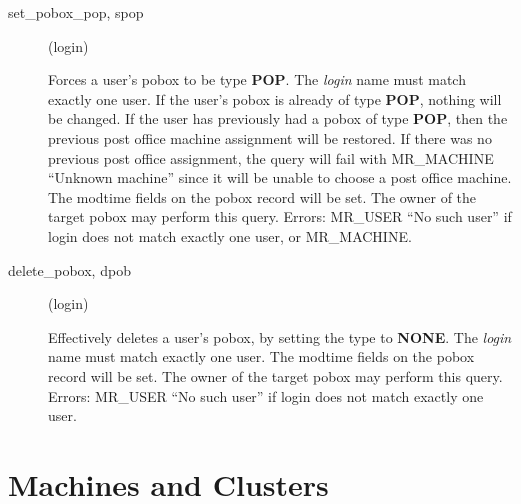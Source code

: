 \documentclass{article}
\begin{document}
\begin{description}
\item[set\_pobox\_pop, spop](login)

Forces a user's pobox to be type {\bf POP}.  The {\em login} name must
match exactly one user.  If the user's pobox is already of type
{\bf POP}, nothing will be changed.  If the user has previously had a
pobox of type {\bf POP}, then the previous post office machine
assignment will be restored.  If there was no previous post office
assignment, the query will fail with MR\_MACHINE ``Unknown machine''
since it will be unable to choose a post office machine.  The modtime
fields on the pobox record will be set.  The owner of the target pobox
may perform this query.  Errors: MR\_USER ``No such user'' if login does
not match exactly one user, or MR\_MACHINE.

\item[delete\_pobox, dpob](login)

Effectively deletes a user's pobox, by setting the type to {\bf NONE}.
The {\em login} name must match exactly one user.  The modtime fields on
the pobox record will be set.  The owner of the target pobox may
perform this query.  Errors: MR\_USER ``No such user'' if login does not
match exactly one user.

\end{description}

\section{Machines and Clusters}
\end{document}
